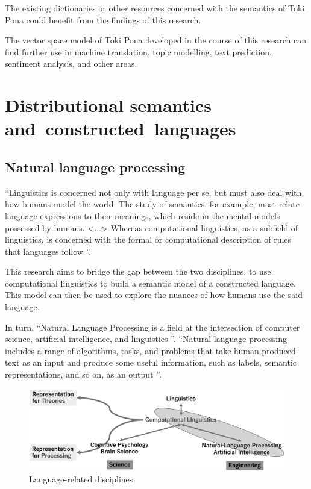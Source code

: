 \documentclass[14pt, a4paper]{extreport}
\begin{document}
The existing dictionaries or other resources concerned with the semantics of Toki Pona could benefit from the findings of this research.

The vector space model of Toki Pona developed in the course of this research can find further use in machine translation, topic modelling, text prediction, sentiment analysis, and other areas.


\chapter{Distributional semantics and~constructed~languages}
  \section{Natural language processing}
``Linguistics is concerned not only with language per se, but must also deal with how humans model the world. The study of semantics, for example, must relate language expressions to their meanings, which reside in the mental models possessed by humans. <...> Whereas computational linguistics, as a subfield of linguistics, is concerned with the formal or computational description of rules that languages follow \parencite{nlpandcl}''.

This research aims to bridge the gap between the two disciplines, to use computational linguistics to build a semantic model of a constructed language. This model can then be used to explore the nuances of how humans use the said language.

In turn, ``Natural Language Processing is a field at the intersection of computer science, artificial intelligence, and linguistics \parencite[7]{practicalnlp}''. ``Natural language processing includes a range of algorithms, tasks, and problems that take human-produced text as an input and produce some useful information, such as labels, semantic representations, and so on, as an output \parencite[4]{realworldnlp}''.

\begin{figure}[ht]
\bigskip
\includegraphics[width=14cm]{nlpcl}
\centering
\caption{Language-related disciplines \parencite{nlpandcl}}
\end{figure}
\end{document}
